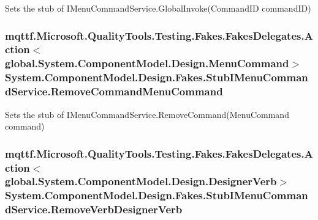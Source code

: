 Sets the stub of I\-Menu\-Command\-Service.\-Global\-Invoke(\-Command\-I\-D command\-I\-D)

\hypertarget{class_system_1_1_component_model_1_1_design_1_1_fakes_1_1_stub_i_menu_command_service_aa85fff747480603b1dd0b36a46ff1eb7}{
\subsubsection[{Remove\-Command\-Menu\-Command}]{\setlength{\rightskip}{0pt plus 5cm}mqttf.\-Microsoft.\-Quality\-Tools.\-Testing.\-Fakes.\-Fakes\-Delegates.\-Action$<$global.\-System.\-Component\-Model.\-Design.\-Menu\-Command$>$ System.\-Component\-Model.\-Design.\-Fakes.\-Stub\-I\-Menu\-Command\-Service.\-Remove\-Command\-Menu\-Command}}\label{class_system_1_1_component_model_1_1_design_1_1_fakes_1_1_stub_i_menu_command_service_aa85fff747480603b1dd0b36a46ff1eb7}


Sets the stub of I\-Menu\-Command\-Service.\-Remove\-Command(\-Menu\-Command command)

\hypertarget{class_system_1_1_component_model_1_1_design_1_1_fakes_1_1_stub_i_menu_command_service_ac47d766ba122d74ab7aaca3589ba2ee7}{
\subsubsection[{Remove\-Verb\-Designer\-Verb}]{\setlength{\rightskip}{0pt plus 5cm}mqttf.\-Microsoft.\-Quality\-Tools.\-Testing.\-Fakes.\-Fakes\-Delegates.\-Action$<$global.\-System.\-Component\-Model.\-Design.\-Designer\-Verb$>$ System.\-Component\-Model.\-Design.\-Fakes.\-Stub\-I\-Menu\-Command\-Service.\-Remove\-Verb\-Designer\-Verb}}\label{class_system_1_1_component_model_1_1_design_1_1_fakes_1_1_stub_i_menu_command_service_ac47d766ba122d74ab7aaca3589ba2ee7}


